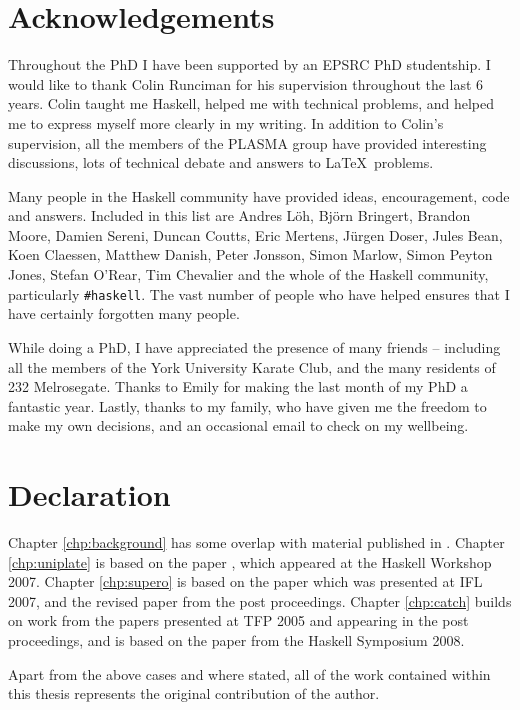 \chapter*{Acknowledgements}

Throughout the PhD I have been supported by an EPSRC PhD studentship. I would like to thank Colin Runciman for his supervision throughout the last 6 years. Colin taught me Haskell, helped me with technical problems, and helped me to express myself more clearly in my writing. In addition to Colin's supervision, all the members of the PLASMA group have provided interesting discussions, lots of technical debate and answers to \LaTeX\ problems.

Many people in the Haskell community have provided ideas, encouragement, code and answers. Included in this list are Andres L\"{o}h, Bj\"{o}rn Bringert, Brandon Moore, Damien Sereni, Duncan Coutts, Eric Mertens, J\"{u}rgen Doser, Jules Bean, Koen Claessen, Matthew Danish, Peter Jonsson, Simon Marlow, Simon Peyton Jones, Stefan O'Rear, Tim Chevalier and the whole of the Haskell community, particularly \verb"#haskell". The vast number of people who have helped ensures that I have certainly forgotten many people.

While doing a PhD, I have appreciated the presence of many friends -- including all the members of the York University Karate Club, and the many residents of 232 Melrosegate. Thanks to Emily for making the last month of my PhD a fantastic year. Lastly, thanks to my family, who have given me the freedom to make my own decisions, and an occasional email to check on my wellbeing.

\chapter*{Declaration}

Chapter \ref{chp:background} has some overlap with material published in \cite{me:yhc_core}. Chapter \ref{chp:uniplate} is based on the paper \cite{me:uniplate}, which appeared at the Haskell Workshop 2007. Chapter \ref{chp:supero} is based on the paper \cite{me:supero_ifl} which was presented at IFL 2007, and the revised paper \cite{me:supero} from the post proceedings. Chapter \ref{chp:catch} builds on work from the papers \cite{me:catch_tfp_original,me:catch_tfp} presented at TFP 2005 and appearing in the post proceedings, and is based on the paper \cite{me:catch} from the Haskell Symposium 2008.

Apart from the above cases and where stated, all of the work contained within this thesis represents the original contribution of the author.
